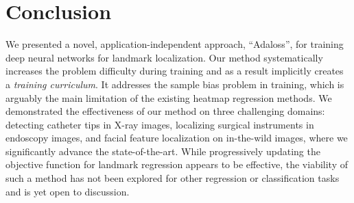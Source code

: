 \documentclass[10pt,twocolumn,letterpaper]{article}
\begin{document}
\section{Conclusion}


We presented a novel, application-independent approach, ``Adaloss'', for training deep neural networks for landmark localization. Our method systematically increases the problem difficulty during training and as a result implicitly creates a \textit{training curriculum}. It addresses the sample bias problem in training, which is arguably the main limitation of the existing heatmap regression methods. We demonstrated the effectiveness of our method on three challenging domains: detecting catheter tips in X-ray images, localizing surgical instruments in endoscopy images, and facial feature localization on in-the-wild images, where we significantly advance the state-of-the-art. While progressively updating the objective
function for landmark regression appears to be effective, the
viability of such a method has not been explored for other regression
or classification tasks and is yet open to discussion.
 


\end{document}
